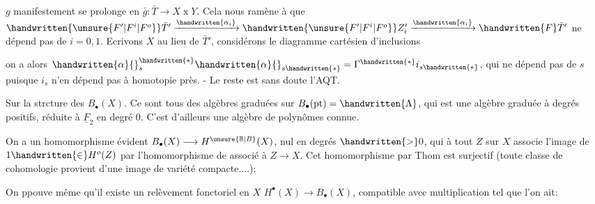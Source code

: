 
$g$ manifestement se prolonge en $\bar{g}:\bar{T}\longrightarrow X\mathbin{x}Y$. Cela nous ramène à  que  $\handwritten{\unsure{F'|F^i|F^o}}\bar T'\xrightarrow{\handwritten{\alpha_i}} \handwritten{\unsure{F'|F^i|F^o}}Z'_i\xrightarrow{\handwritten{\alpha_i}}\handwritten{F}\bar T'$ ne dépend pas de $i=0,1$. Ecrivons $X$ au lieu de $\bar T'$,  considérons le diagramme cartésien d'inclusions


on a alors $\handwritten{\alpha}{}_{s}^{\handwritten{*}}\handwritten{\alpha}{}_{s\handwritten{*}}=\Gamma^{\handwritten{*}}i_{s\handwritten{*}}$, qui ne dépend pas de $s$ puisque $i_s$ n'en dépend pas à homotopie près. - Le reste est sans doute l'AQT.

Sur la strcture des $B_{\bullet}(X)$. Ce sont tous des algèbres graduées sur $B_{\bullet}(\mathrm{pt})=\handwritten{\Lambda}$, qui est une algèbre graduée à degrés positifs, réduite à $\underline{F}_2$ en degré $0$. C'est d'ailleurs une algèbre de polynômes connue.

On a un homomorphisme  évident $B_{\bullet}(X)\longrightarrow H^{\unsure{\mathbb B|B}}(X)$, nul en degrés $\handwritten{>}0$, qui à tout $Z$ sur $X$ associe l'image de $1\handwritten{\in} H^o(Z)$ par l'homomorphisme de  associé à $Z\longrightarrow X$. Cet homomorphisme par Thom est surjectif (toute classe de cohomologie provient d'une image de variété compacte....); 

On ppouve même qu'il existe un relèvement fonctoriel en $X$ $H^{\bullet}(X)\longrightarrow B_{\bullet}(X)$, \handwritten{(} compatible avec multiplication\handwritten{)} tel que l'on ait:

